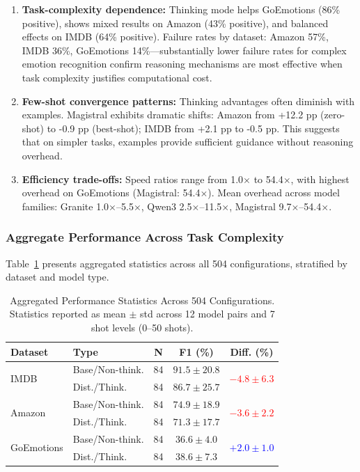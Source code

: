 \begin{enumerate}[leftmargin=*]
    \item \textbf{Task-complexity dependence:} Thinking mode helps GoEmotions (86\% positive), shows mixed results on Amazon (43\% positive), and balanced effects on IMDB (64\% positive). Failure rates by dataset: Amazon 57\%, IMDB 36\%, GoEmotions 14\%---substantially lower failure rates for complex emotion recognition confirm reasoning mechanisms are most effective when task complexity justifies computational cost.
    
    \item \textbf{Few-shot convergence patterns:} Thinking advantages often diminish with examples. Magistral exhibits dramatic shifts: Amazon from +12.2 pp (zero-shot) to -0.9 pp (best-shot); IMDB from +2.1 pp to -0.5 pp. This suggests that on simpler tasks, examples provide sufficient guidance without reasoning overhead.
    
    \item \textbf{Efficiency trade-offs:} Speed ratios range from 1.0$\times$ to 54.4$\times$, with highest overhead on GoEmotions (Magistral: 54.4$\times$). Mean overhead across model families: Granite 1.0$\times$--5.5$\times$, Qwen3 2.5$\times$--11.5$\times$, Magistral 9.7$\times$--54.4$\times$.
\end{enumerate}

\subsubsection{Aggregate Performance Across Task Complexity}

Table~\ref{tab:aggregated_complexity} presents aggregated statistics across all 504 configurations, stratified by dataset and model type.

\begin{table}[htbp]
\centering
\caption{Aggregated Performance Statistics Across 504 Configurations. Statistics reported as mean $\pm$ std across 12 model pairs and 7 shot levels (0--50 shots).}
\label{tab:aggregated_complexity}
\begin{tabular}{@{}llccc@{}}
\toprule
\textbf{Dataset} & \textbf{Type} & \textbf{N} & \textbf{F1 (\%)} & \textbf{Diff. (\%)} \\
\midrule
\multirow{2}{*}{IMDB} & Base/Non-think. & 84 & $91.5 \pm 20.8$ & \multirow{2}{*}{\textcolor{red}{$-4.8\pm6.3$}} \\
& Dist./Think. & 84 & $86.7 \pm 25.7$ & \\
\midrule
\multirow{2}{*}{Amazon} & Base/Non-think. & 84 & $74.9 \pm 18.9$ & \multirow{2}{*}{\textcolor{red}{$-3.6\pm2.2$}} \\
& Dist./Think. & 84 & $71.3 \pm 17.7$ & \\
\midrule
\multirow{2}{*}{GoEmotions} & Base/Non-think. & 84 & $36.6 \pm 4.0$ & \multirow{2}{*}{\textcolor{blue}{$+2.0\pm1.0$}} \\
& Dist./Think. & 84 & $38.6 \pm 7.3$ & \\
\bottomrule
\end{tabular}
\end{table}

